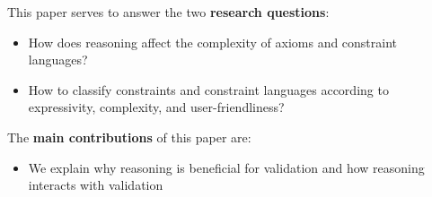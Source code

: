 \documentclass{llncs}
\begin{document}
%

This paper serves to answer the two \textbf{research questions}:
\begin{itemize}
	\item How does reasoning affect the complexity of axioms and constraint languages?
	\item How to classify constraints and constraint languages according to expressivity, complexity, and user-friendliness?
\end{itemize}

The \textbf{main contributions} of this paper are:
\begin{itemize}
	\item We explain why reasoning is beneficial for validation and how reasoning interacts with validation
\end{itemize}
\end{document}
